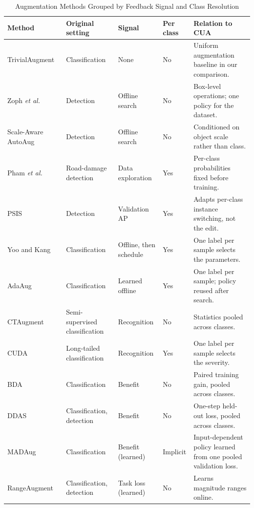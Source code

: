 \documentclass[conference]{IEEEtran}
\begin{document}
\begin{table}[t]
\caption{Augmentation Methods Grouped by Feedback Signal and Class Resolution}
\label{tab:policies}
\centering
\small
\setlength{\tabcolsep}{3.5pt}
\renewcommand{\arraystretch}{1.12}
\begin{tabularx}{\textwidth}{@{}p{}p{}p{}p{}Y@{}}
\toprule
\textbf{Method} & \textbf{Original setting} & \textbf{Signal} & \textbf{Per class} & \textbf{Relation to CUA} \\
\midrule
TrivialAugment~\cite{muller2021trivial} & Classification & None & No & Uniform augmentation baseline in our comparison. \\
Zoph \emph{et al.}~\cite{zoph2020det} & Detection & Offline search & No & Box-level operations; one policy for the dataset. \\
Scale-Aware AutoAug~\cite{chen2021scale} & Detection & Offline search & No & Conditioned on object scale rather than class. \\
Pham \emph{et al.}~\cite{rdd_detectron2} & Road-damage detection & Data exploration & Yes & Per-class probabilities fixed before training. \\
PSIS~\cite{wang2019psis} & Detection & Validation AP & Yes & Adapts per-class instance switching, not the edit. \\
Yoo and Kang~\cite{yoo2023} & Classification & Offline, then schedule & Yes & One label per sample selects the parameters. \\
AdaAug~\cite{cheung2022adaaug} & Classification & Learned offline & Yes & One label per sample; policy reused after search. \\
CTAugment~\cite{berthelot2020} & Semi-supervised classification & Recognition & No & Statistics pooled across classes. \\
CUDA~\cite{ahn2023cuda} & Long-tailed classification & Recognition & Yes & One label per sample selects the severity. \\
BDA~\cite{lu2023bda} & Classification & Benefit & No & Paired training gain, pooled across classes. \\
DDAS~\cite{liu2021ddas} & Classification, detection & Benefit & No & One-step held-out loss, pooled across classes. \\
MADAug~\cite{hou2023madaug} & Classification & Benefit (learned) & Implicit & Input-dependent policy learned from one pooled validation loss. \\
RangeAugment~\cite{mehta2022rangeaugment} & Classification, detection & Task loss (learned) & No & Learns magnitude ranges online. \\

\end{tabularx}
\end{table}
\end{document}
